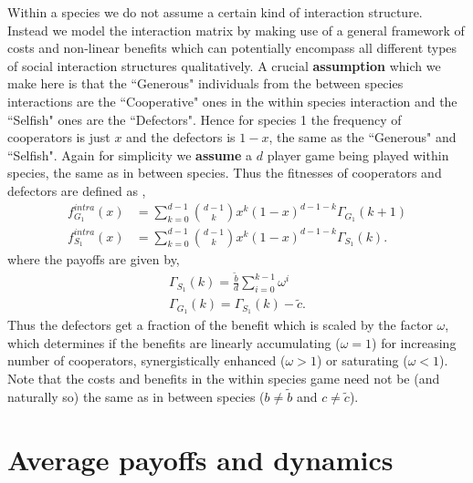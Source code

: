 \documentclass{pnastwo}
\begin{document}
\begin{article}
Within a species we do not assume a certain kind of interaction structure.
Instead we model the interaction matrix by making use of a general framework of costs and non-linear benefits \cite{eshel:AmNat:1988,hauert:JTB:2006a} which can potentially encompass all different types of social interaction structures qualitatively.
A crucial \textbf{assumption} which we make here is that the ``Generous" individuals from the between species interactions are the ``Cooperative" ones in the within species interaction and the ``Selfish" ones are the ``Defectors".
Hence for species 1 the frequency of cooperators is just $x$ and the defectors is $1-x$, the same as the ``Generous" and ``Selfish".
Again for simplicity we \textbf{assume} a $d$ player game being played within species, the same as in between species.
Thus the fitnesses of cooperators and defectors are defined as \cite{hauert:JTB:2006a},
%
\begin{align}
	f^{intra}_{G_1} (x) &= \sum_{k=0}^{d-1} \binom{d-1}{k}x^k (1-x)^{d-1-k} \Gamma_{G_1}(k+1) \\
	f^{intra}_{S_1} (x) &= \sum_{k=0}^{d-1} \binom{d-1}{k}x^k (1-x)^{d-1-k} \Gamma_{S_1}(k).
\label{intrafiteqs}
\end{align}
%
where the payoffs are given by,
\begin{align}
	\Gamma_{S_1} (k) = \frac{\tilde{b}}{d} \sum_{i=0}^{k-1} \omega^i \\
	\Gamma_{G_1} (k) = \Gamma_{S_1} (k) - \tilde{c}.
\end{align}
%
Thus the defectors get a fraction of the benefit which is scaled by the factor $\omega$, which determines if the benefits are linearly accumulating ($\omega=1$) for increasing number of cooperators, synergistically enhanced ($\omega>1$) or saturating ($\omega<1$).
Note that the costs and benefits in the within species game need not be (and naturally so) the same as in between species ($b\neq \tilde{b}$ and $c \neq \tilde{c}$).


\section{Average payoffs and dynamics}


\end{article}
\end{document}
